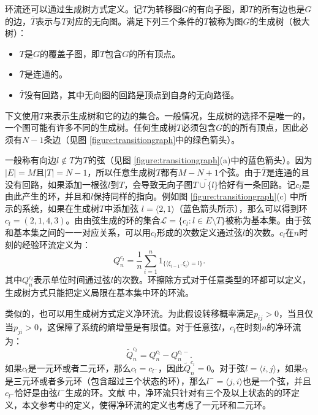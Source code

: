 环流还可以通过生成树方式定义\cite{Schnakenberg1976NetworkTO,kalpazidou2007cycle}。记$T$为转移图$G$的有向子图，即$T$的所有边也是$G$的边，$\bar{T}$表示与$T$对应的无向图。满足下列三个条件的$T$被称为图$G$的生成树（极大树）：
\begin{itemize}
    \item $T$是$G$的覆盖子图，即$T$包含$G$的所有顶点。
    \item $\bar{T}$是连通的。
    \item $\bar{T}$没有回路，其中无向图的回路是顶点到自身的无向路径。
\end{itemize}

下文使用$T$来表示生成树和它的边的集合。一般情况，生成树的选择不是唯一的，一个图可能有许多不同的生成树。任何生成树$T$必须包含$G$的的所有顶点，因此必须有$N-1$条边（见图 \ref{figure:transitiongraph}中的绿色箭头）\cite{kalpazidou2007cycle}。

一般称有向边$l \notin T$为$T$的弦（见图 \ref{figure:transitiongraph}(a)中的蓝色箭头）。因为$|E|=M$且$|T|= N-1$，所以任意生成树$T$都有$M-N+1$个弦。由于$\bar{T}$是连通的且没有回路，如果添加一根弦$l$到$T$，会导致无向子图$\overline{T \cup \{l\}}$恰好有一条回路。记$c_l$是由此产生的环，并且和$l$保持同样的指向。例如图 \ref{figure:transitiongraph}(c) 中所示的系统，如果在生成树$T$中添加弦 $l=\langle 2,1 \rangle$（蓝色箭头所示），那么可以得到环 $c_l=(2,1,4,3)$。由由弦生成的环的集合$\mathcal{L} = \{c_l: l\in E\setminus T\}$被称为基本集。由于弦和基本集之间的一一对应关系，可以用$c_l$形成的次数定义通过弦$l$的次数。$c_l$在$n$时刻的经验环流定义为：
\begin{equation*}
    Q^{c_l}_n = \frac{1}{n}\sum_{i=1}^n1_{\{\langle\xi_{i-1},\xi_i\rangle=l\}}.
\end{equation*}
其中$Q^{c_l}_n$表示单位时间通过弦$l$的次数。环擦除方式对于任意类型的环都可以定义，生成树方式只能把定义局限在基本集中环的环流。

类似的，也可以用生成树方式定义净环流。为此假设转移概率满足$p_{ij}>0$，当且仅当$p_{ji}>0$，这保障了系统的熵增量是有限值\cite{Schnakenberg1976NetworkTO,jiang2004mathematical}。对于任意弦$l$，$c_l$在时刻$n$的净环流为：
\begin{equation*}
    \tilde{Q}^{c_l}_n=Q^{c_l}_n-Q^{c_l-}_n.
\end{equation*}
如果$c_l$是一元环或者二元环，那么$c_l = c_{l^-}$，因此$\tilde{Q}_n^{c_l}=0$。对于弦$l=\langle i,j \rangle$，如果$c_l$是三元环或者多元环（包含超过三个状态的环），那么$l^-=\langle j,i\rangle$也是一个弦，并且$c_{l^-}$恰好是由弦$l^-$生成的环。文献 \cite{Schnakenberg1976NetworkTO, andrieux2007fluctuation, andrieux2007network}中，净环流只针对有三个及以上状态的的环定义，本文参考\cite{kalpazidou2007cycle}中的定义，使得净环流的定义也考虑了一元环和二元环。

